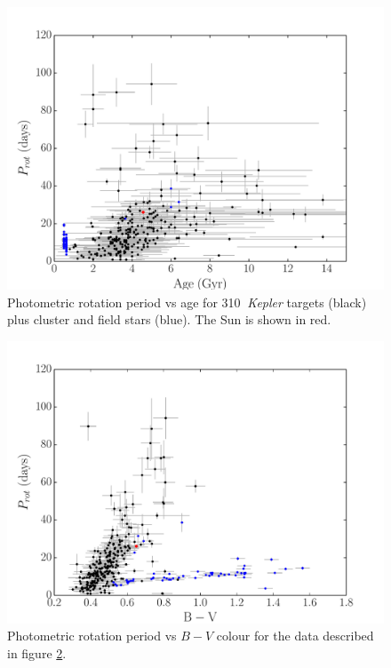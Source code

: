 \documentclass[11pt,preprint]{aastex}
\newcommand{\nastero}{310}
\begin{document}



\begin{figure}[ht]
\begin{center}
\includegraphics[width=6in, clip=true, trim=0 0 0.5in 0]{p_vs_a_paper2.pdf}
\caption{Photometric rotation period vs age for \nastero$~$ {\it Kepler} targets (black) plus cluster and field stars (blue). The Sun is shown in red.
\label{fig:p_vs_a}}
\end{center}
\end{figure}

\begin{figure}[ht]
\begin{center}
\includegraphics[width=6in, clip=true, trim=0 0 0.5in 0]{p_vs_bv_paper2.pdf}
\caption{Photometric rotation period vs $B-V$ colour for the data described in figure \ref{fig:3d}.
\label{fig:3d}}
\end{center}
\end{figure}
\end{document}
